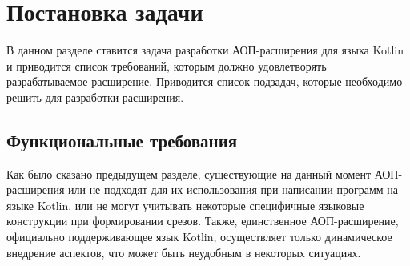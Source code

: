\chapter{Постановка задачи}
\label{ch:tasks}
В данном разделе ставится задача разработки АОП-расширения для языка Kotlin и приводится список требований, которым должно удовлетворять разрабатываемое расширение.
Приводится список подзадач, которые необходимо решить для разработки расширения.
\section{Функциональные требования}
Как было сказано предыдущем разделе, существующие на данный момент АОП-расширения или не подходят для их использования при написании программ на языке Kotlin, или не могут учитывать некоторые специфичные языковые конструкции при формировании срезов.
Также, единственное АОП-расширение, официально поддерживающее язык Kotlin, осуществляет только динамическое внедрение аспектов, что может быть неудобным в некоторых ситуациях.

